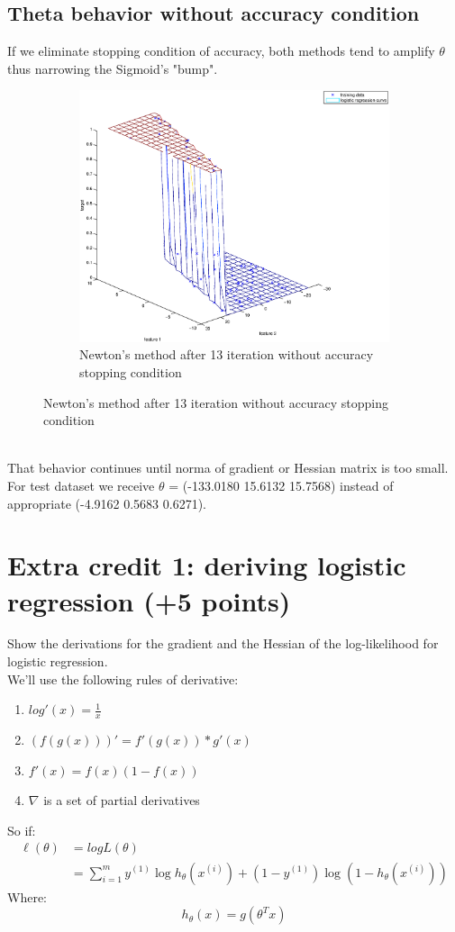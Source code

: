 \documentclass{article}
\begin{document}
	\pagebreak
	\subsection{Theta behavior without accuracy condition}
	If we eliminate stopping condition of accuracy, both methods tend to amplify $\theta$ thus narrowing the Sigmoid's "bump". 
	\begin{figure}[h]
		\centering
		\begin{subfigure}{.5\textwidth}
			\centering
			\includegraphics[width=.9\linewidth]{testdataset_no_accuracy_condition.eps}
			\caption{Newton's method after 13 iteration without accuracy stopping condition}
			\label{fig:sub1}
		\end{subfigure}%
	\end{figure} 
	\\That behavior continues until norma of gradient or Hessian matrix is too small. For test dataset we receive $\theta$ = (-133.0180 15.6132 15.7568) instead of appropriate  (-4.9162	0.5683	0.6271).
	
\section{Extra credit 1: deriving logistic regression (+5 points)}
	Show the derivations for the gradient and the Hessian of the log-likelihood for logistic regression.\\
	We'll use the following rules of derivative:
	\begin{enumerate}
		\item $log'(x) = \frac{1}{x}$
		\item $(f(g(x)))' = f'(g(x)) * g'(x)$
		\item $f'(x) = f(x)(1-f(x))$
		\item $\nabla$ is a set of partial derivatives
	\end{enumerate}
	So if:
	\begin{align*}
	\ell(\theta) &= logL(\theta)\\
	&= \sum_{i=1}^{m} y^{(1)} \log h_{\theta}(x^{(i)}) + (1-y^{(1)}) \log (1 - h_{\theta}(x^{(i)})) 
	\end{align*}
	Where:
	$$h_{\theta}(x) = g(\theta^T x)$$
	
\end{document}
